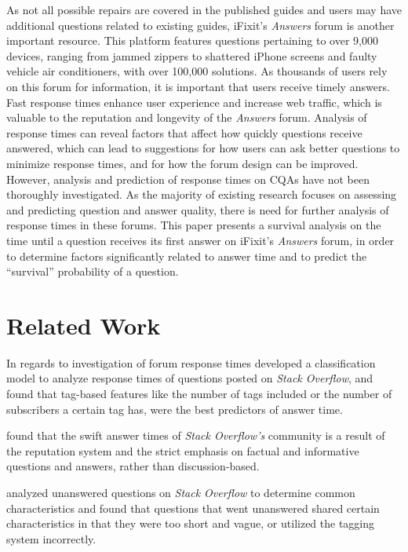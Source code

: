 \documentclass{article}
\begin{document}
As not all possible repairs are covered in the published guides and users may have additional questions related to existing guides, iFixit's \textit{Answers} forum is another important resource. This platform features questions pertaining to over 9,000 devices, ranging from jammed zippers to shattered iPhone screens and faulty vehicle air conditioners, with over 100,000 solutions. As thousands of users rely on this forum for information, it is important that users receive timely answers. Fast response times enhance user experience and increase web traffic, which is valuable to the reputation and longevity of the \textit{Answers} forum. Analysis of response times can reveal factors that affect how quickly questions receive answered, which can lead to suggestions for how users can ask better questions to minimize response times, and for how the forum design can be improved. 
However, analysis and prediction of response times on CQAs have not been thoroughly investigated. As the majority of existing research focuses on assessing and predicting question and answer quality, there is need for further analysis of response times in these forums. This paper presents a survival analysis on the time until a question receives its first answer on iFixit's \textit{Answers} forum, in order to determine factors significantly related to answer time and to predict the ``survival'' probability of a question.


\section*{Related Work}
  
In regards to investigation of forum response times \cite{Bhat2014} developed a classification model to analyze response times of questions posted on \textit{Stack Overflow}, and found that tag-based features like the number of tags included or the number of subscribers a certain tag has, were the best predictors of answer time. 

\cite{Mamykina2011} found that the swift answer times of \textit{Stack Overflow's} community is a result of the reputation system and the strict emphasis on factual and informative questions and answers, rather than discussion-based. 

\cite{Asaduzzaman2013} analyzed unanswered questions on \textit{Stack Overflow} to determine common characteristics and found that questions that went unanswered shared certain characteristics in that they were too short and vague, or utilized the tagging system incorrectly. 
\end{document}
